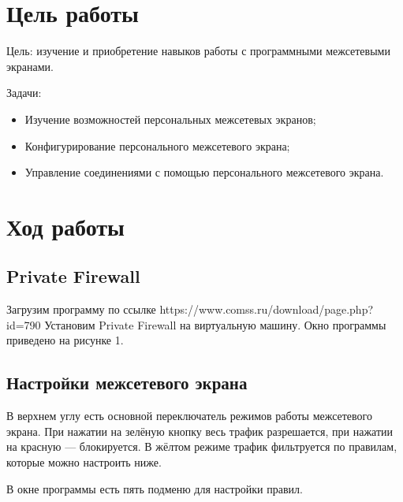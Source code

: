 \section{Цель работы}
Цель: изучение и приобретение навыков работы с программными межсетевыми экранами. 

Задачи:
\begin{itemize}
    \item Изучение возможностей персональных межсетевых экранов;
    \item Конфигурирование персонального межсетевого экрана;
    \item Управление соединениями с помощью персонального межсетевого экрана.
\end{itemize}


\section{Ход работы}
\subsection{Private Firewall}
Загрузим программу по ссылке https://www.comss.ru/download/page.php?\linebreak id=790
Установим Private Firewall на виртуальную машину. Окно программы приведено на рисунке 1.

\FloatBarrier

\subsection{Настройки межсетевого экрана}
В верхнем углу есть основной переключатель режимов работы межсетевого экрана. При нажатии на зелёную кнопку весь трафик разрешается, при нажатии на красную — блокируется. В жёлтом режиме трафик фильтруется по правилам, которые можно настроить ниже.

В окне программы есть пять подменю для настройки правил.

